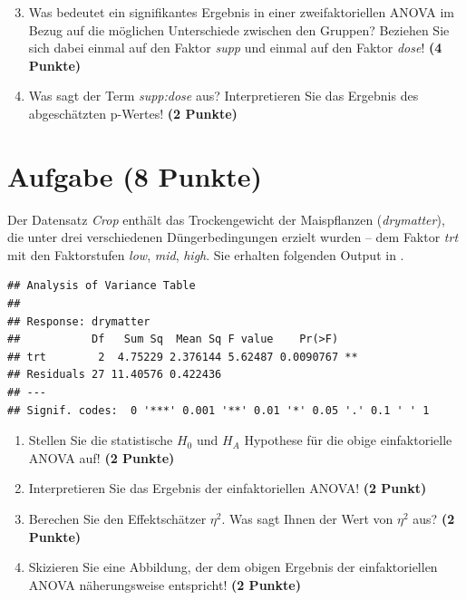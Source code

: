 \documentclass[a4paper, 10pt]{scrartcl}\usepackage[]{graphicx}\usepackage[]{color}
\makeatletter
\newenvironment{kframe}{%
 \def\at@end@of@kframe{}%
 \ifinner\ifhmode%
  \def\at@end@of@kframe{\end{minipage}}%
  \begin{minipage}{\columnwidth}%
 \fi\fi%
 \def\FrameCommand##1{\hskip\@totalleftmargin \hskip-\fboxsep
 \colorbox{shadecolor}{##1}\hskip-\fboxsep
     \hskip-\linewidth \hskip-\@totalleftmargin \hskip\columnwidth}%
 \MakeFramed {\advance\hsize-\width
   \@totalleftmargin\z@ \linewidth\hsize
   \@setminipage}}%
 {\par\unskip\endMakeFramed%
 \at@end@of@kframe}
\newenvironment{knitrout}{}{} %
\makeatother
\begin{document}
\vspace{1Ex}

\begin{enumerate}
  \setcounter{enumi}{2}
\item Was bedeutet ein signifikantes Ergebnis in einer zweifaktoriellen
  ANOVA im Bezug auf die m{\"o}glichen Unterschiede zwischen den Gruppen?
  Beziehen Sie sich dabei einmal auf den Faktor \textit{supp} und einmal
  auf den Faktor \textit{dose}! \textbf{(4 Punkte)}
\item Was sagt der Term \textit{supp:dose} aus? Interpretieren Sie das
  Ergebnis des abgesch{\"a}tzten p-Wertes! \textbf{(2 Punkte)}
\end{enumerate}
 
\clearpage

\section{Aufgabe \hfill (8 Punkte)}


Der Datensatz \textit{Crop} enth{\"a}lt das Trockengewicht der
Maispflanzen (\textit{drymatter}), die unter drei 
verschiedenen D{\"u}ngerbedingungen erzielt wurden -- dem Faktor
\textit{trt} mit den Faktorstufen \textit{low}, \textit{mid},
\textit{high}. Sie erhalten folgenden Output in \Rlogo.

\begin{knitrout}
\color{fgcolor}\begin{kframe}
\begin{verbatim}
## Analysis of Variance Table
## 
## Response: drymatter
##           Df   Sum Sq  Mean Sq F value    Pr(>F)   
## trt        2  4.75229 2.376144 5.62487 0.0090767 **
## Residuals 27 11.40576 0.422436                     
## ---
## Signif. codes:  0 '***' 0.001 '**' 0.01 '*' 0.05 '.' 0.1 ' ' 1
\end{verbatim}
\end{kframe}
\end{knitrout}

\begin{enumerate}
\item Stellen Sie die statistische $H_0$ und $H_A$ Hypothese f{\"u}r die obige
  einfaktorielle ANOVA auf! \textbf{(2 Punkte)}
\item Interpretieren Sie das Ergebnis der einfaktoriellen ANOVA! \textbf{(2 Punkt)} 
\item Berechen Sie den Effektsch{\"a}tzer $\eta^2$. Was sagt Ihnen der Wert von
  $\eta^2$ aus? \textbf{(2 Punkte)}
\item Skizieren Sie eine Abbildung, der dem obigen Ergebnis der
  einfaktoriellen ANOVA n{\"a}herungsweise entspricht! \textbf{(2 Punkte)}
\end{enumerate}
\end{document}
